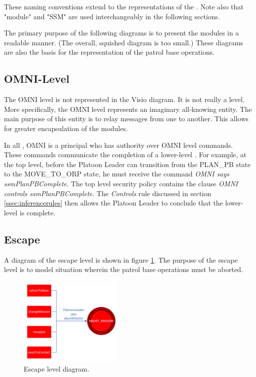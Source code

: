 \documentclass[../../main/main.tex]{subfiles}
\begin{document}
These naming conventions extend to the  representations of the .  Note also that "module" and "SSM" are used interchangeably in the following sections.  

The primary purpose of the following diagrams is to present the modules in a readable manner.  (The overall, squished diagram is too small.)  These diagrams are also the basis for the  representation of the patrol base operations.
 
\subsection{OMNI-Level}\label{ssec:omnilevel}
The OMNI level is not represented in the Visio diagram.  It is not really a level.  More specifically, the OMNI level represents an imaginary all-knowing entity.  The main purpose of this entity is to relay messages from one  to another.  This allows for greater encapsulation of the modules. 

In all , OMNI is a principal who has authority over OMNI level commands.  These commands communicate the completion of a lower-level .  For example, at the top level, before the Platoon Leader can transition from the PLAN_PB state to the MOVE_TO_ORP state, he must receive the command \textit{OMNI says ssmPlanPBComplete}.  The top level security policy contains the clause \textit{OMNI controls ssmPlanPBComplete}.  The \textit{Controls} rule discussed in section \ref{ssec:inferencerules} then allows the Platoon Leader to conclude that the lower-level  is complete.  

\subsection{Escape}\label{ssec:escape}
A diagram of the escape level is shown in figure \ref{escapeDiagram}.  The purpose of the escape level is to model situation wherein the patrol base operations must be aborted.  

\begin{figure}[h!]
\centering
\includegraphics[width=0.45\textwidth]{../figures/escapeDiagram}
\caption{\label{escapeDiagram} Escape level diagram.}
\end{figure}
\clearpage
\end{document}
